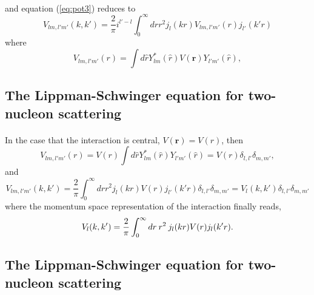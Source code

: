 \documentclass[%
twoside,                 %
final,                   %
10pt]{article}
\begin{document}
\paragraph{}
and equation (\ref{eq:pot3}) reduces to  
\begin{equation}
  V_{lm, l'm'}(k,k') = \frac{2}{\pi}i^{l' -l}\int_0^\infty drr^2j_l(kr) V_{lm,l'm'}(r) j_{l'}(k'r)
  \label{eq:pot6}
\end{equation}
where 
\begin{equation}
  V_{lm, l'm'}(r) = \int d{\hat{r}}Y_{lm}^*(\hat{r})V(\mathbf{r})Y_{l'm'}(\hat{r}),
  \label{eq:pot10}
\end{equation}



\subsection*{The Lippman-Schwinger equation for two-nucleon scattering}

\paragraph{}
In the case that the interaction is central, $V(\mathbf{r}) = V(r)$, then
\begin{equation}
  V_{lm, l'm'}(r) = V(r) \int d{\hat{r}}Y_{lm}^*(\hat{r})Y_{l'm'}(\hat{r}) = V(r) \delta_{l,l'}\delta_{m,m'},
  \label{eq:pot7}
\end{equation}
and 
\begin{equation}
  V_{lm, l'm'}(k,k') = \frac{2}{\pi} \int_0^\infty drr^2j_l(kr) V(r) j_{l'}(k'r)\delta_{l,l'}\delta_{m,m'} = V_l(k,k') \delta_{l,l'}\delta_{m,m'}
  \label{eq:pot8}
\end{equation}
where the momentum space representation of the interaction finally reads,
\begin{equation}
  V_{l}(k,k') = {2 \over \pi} \int_0^\infty dr\: r^2 \:
  j_l(kr) V(r) j_{l}(k'r).
  \label{eq:pot9}
\end{equation}



\subsection*{The Lippman-Schwinger equation for two-nucleon scattering}

\end{document}
